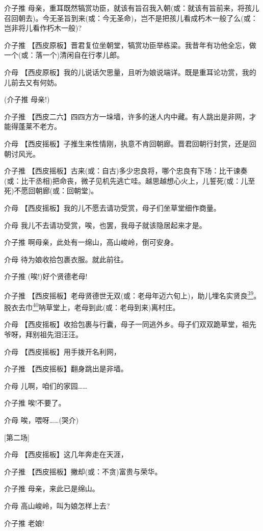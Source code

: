 介子推
母亲，重耳既然犒赏功臣，就该有旨召我入朝(或：就该有旨前来，将孩儿召回朝去)。今无圣旨到来(或：今无圣命)，岂不是把孩儿看成朽木一般了么(或：岂非将儿看作朽木一般)?

介子推
【西皮原板】晋君复位坐朝堂，犒赏功臣举栋梁。我昔年有功他全忘，做一个(或：落一个)清闲自在行孝儿郎。

介母
【西皮原板】我的儿说话欠思量，且听为娘说端详。既是重耳论功赏，我的儿前去又有何妨。

(介子推 母亲!)

介子推
【西皮二六】四四方方一垛墙，许多的迷人内中藏。有人跳出是非网，才能得蓬莱不老方。

介母
【西皮摇板】子推生来性情刚，执意不肯回朝廊。晋君回朝行封赏，还是回朝讨风光。

介子推
【西皮摇板】古来(或：自古)多少忠良将，哪个忠良有下场：比干谏奏(或：比干丞相)把命丧，微子见机先逃亡哇。越思越想心火上，儿誓死(或：儿至死)不愿回朝廊(或：回朝堂)。

介母 【西皮摇板】我的儿不愿去请功受赏，母子们坐草堂细作商量。

介母 我儿不去请功受赏，唉，也罢，我母子就该隐居起来才是。

介子推 啊母亲，此处有一绵山，高山峻岭，倒可安身。

介母 待为娘收拾包裹衣服。就此前往。

介子推 (唉!)好个贤德老母!

介子推
【西皮摇板】老母贤德世无双(或：老母年迈六旬上)，助儿埋名实贤良\protect\hyperlink{fn39}{\textsuperscript{39}}。脱衣去巾\protect\hyperlink{fn40}{\textsuperscript{40}}呐草堂上，老母到此(或：老母到来)离村庄。

介母
【西皮摇板】收拾包裹与行囊，母子一同逃外乡。母子们双双跪草堂，祖先爷呀，拜别祖先泪汪汪。

介母 【西皮摇板】用手拨开名利网，

介子推 【西皮摇板】翻身跳出是非墙。

介母 儿啊，咱们的家园\ldots{}\ldots{}

介子推 唉!不要了。

介母 唉，喂呀\ldots{}\ldots{}(哭介)

{[}第二场{]}

介母 【西皮摇板】这几年奔走在天涯，

介子推 【西皮摇板】撇却(或：不贪)富贵与荣华。

介子推 母亲，来此已是绵山。

介母 高山峻岭，叫为娘怎样上去?

介子推 老娘!

